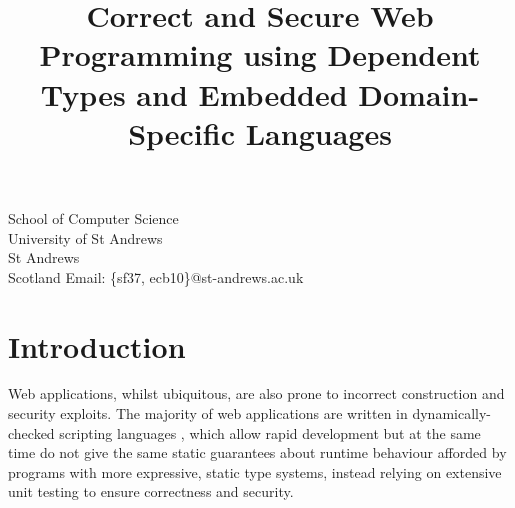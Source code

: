 \documentclass[preprint]{sigplanconf}
\begin{document}
\newcommand{\idris}{\textsc{Idris}}
\setlength{\pdfpageheight}{\paperheight}
\setlength{\pdfpagewidth}{\paperwidth}





\preprintfooter{}   %

\title{Correct and Secure Web Programming using 
Dependent Types and Embedded Domain-Specific Languages}

           {School of Computer Science \\ University of St Andrews \\ St Andrews \\ Scotland}
           {Email: \{sf37, ecb10\}@st-andrews.ac.uk}

\maketitle

\begin{abstract}

 
\end{abstract}




\section{Introduction}
Web applications, whilst ubiquitous, are also prone to incorrect construction and security exploits. The majority of web applications are written in dynamically-checked scripting languages \cite{}, which allow rapid development but at the same time do not give the same static guarantees about runtime behaviour afforded by programs with more expressive, static type systems, instead relying on extensive unit testing to ensure correctness and security. 
\end{document}
